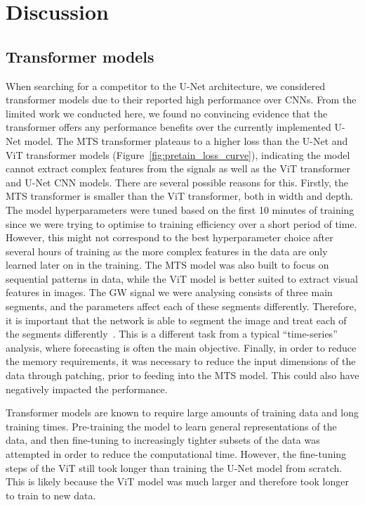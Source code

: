 \section{Discussion}
\label{sec:discussion}

\subsection{Transformer models}

When searching for a competitor to the U-Net architecture, we considered transformer models due to their reported high performance over CNNs. From the limited work we conducted here, we found no convincing evidence that the transformer offers any performance benefits over the currently implemented U-Net model. The MTS transformer plateaus to a higher loss than the U-Net and ViT transformer models (Figure~\ref{fig:pretain_loss_curve}), indicating the model cannot extract complex features from the signals as well as the ViT transformer and U-Net CNN models. There are several possible reasons for this. Firstly, the MTS transformer is smaller than the ViT transformer, both in width and depth. The model hyperparameters were tuned based on the first 10 minutes of training since we were trying to optimise to training efficiency over a short period of time. However, this might not correspond to the best hyperparameter choice after several hours of training as the more complex features in the data are only learned later on in the training. The MTS model was also built to focus on sequential patterns in data, while the ViT model is better suited to extract visual features in images. The GW signal we were analysing consists of three main segments, and the parameters affect each of these segments differently. Therefore, it is important that the network is able to segment the image and treat each of the segments differently~\cite{bhardwaj2023peregrine}. This is a different task from a typical \enquote{time-series} analysis, where forecasting is often the main objective. Finally, in order to reduce the memory requirements, it was necessary to reduce the input dimensions of the data through patching, prior to feeding into the MTS model. This could also have negatively impacted the performance.

Transformer models are known to require large amounts of training data and long training times. Pre-training the model to learn general representations of the data, and then fine-tuning to increasingly tighter subsets of the data was attempted in order to reduce the computational time. However, the fine-tuning steps of the ViT still took longer than training the U-Net model from scratch.  This is likely because the ViT model was much larger and therefore took longer to train to new data.

